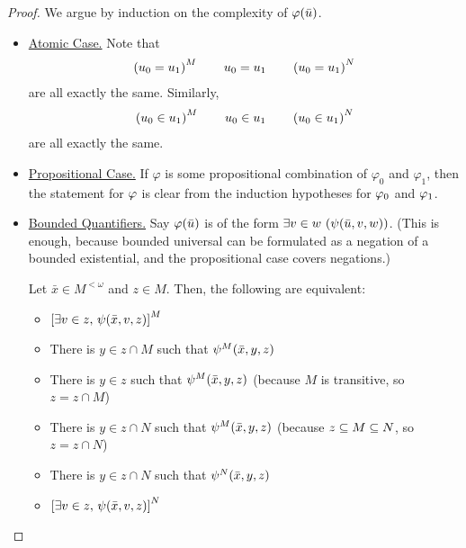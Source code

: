 \begin{proof}
    We argue by induction on the complexity of $\varphi\!\left( \bar{u} \right)$.

    \begin{itemize}
        \item \underline{Atomic Case.} Note that
        \begin{align*}
            \left( u_0 = u_1 \right)^M
            \qquad
            u_0 = u_1
            \qquad
            \left( u_0 = u_1 \right)^N
        \end{align*}
        are all exactly the same. Similarly,
        \begin{align*}
            \left( u_0 \in u_1 \right)^M
            \qquad
            u_0 \in u_1
            \qquad
            \left( u_0 \in u_1 \right)^N
        \end{align*}
        are all exactly the same.

        \item \underline{Propositional Case.} If $\varphi$ is some propositional combination of $\varphi_0$ and $\varphi_1$, then the statement for $\varphi$ is clear from the induction hypotheses for $\varphi_0$ and $\varphi_1$.

        \item \underline{Bounded Quantifiers.} Say $\varphi\!\left( \bar{u} \right)$ is of the form $\exists v \in w \, \left( \psi\!\left( \bar{u}, v, w \right) \right)$. (This is enough, because bounded universal can be formulated as a negation of a bounded existential, and the propositional case covers negations.)

        Let $\bar{x} \in M^{<\omega}$ and $z \in M$. Then, the following are equivalent:
        \begin{itemize}
            \item $\left[ \exists v \in z, \, \psi\!\left( \bar{x}, v, z \right) \right]^M$
            \item There is $y \in z \cap M$ such that $\psi^M\!\left( \bar{x}, y, z \right)$
            \item There is $y \in z$ such that $\psi^M\!\left( \bar{x}, y, z \right)$ (because $M$ is transitive, so $z = z \cap M$)
            \item There is $y \in z \cap N$ such that $\psi^M\!\left( \bar{x}, y, z \right)$ (because $z \subseteq M \subseteq N$, so $z = z \cap N$)
            \item There is $y \in z \cap N$ such that $\psi^N\!\left( \bar{x}, y, z \right)$
            \item $\left[ \exists v \in z, \, \psi\!\left( \bar{x}, v, z \right) \right]^N$
        \end{itemize}
    \end{itemize}
\end{proof}


